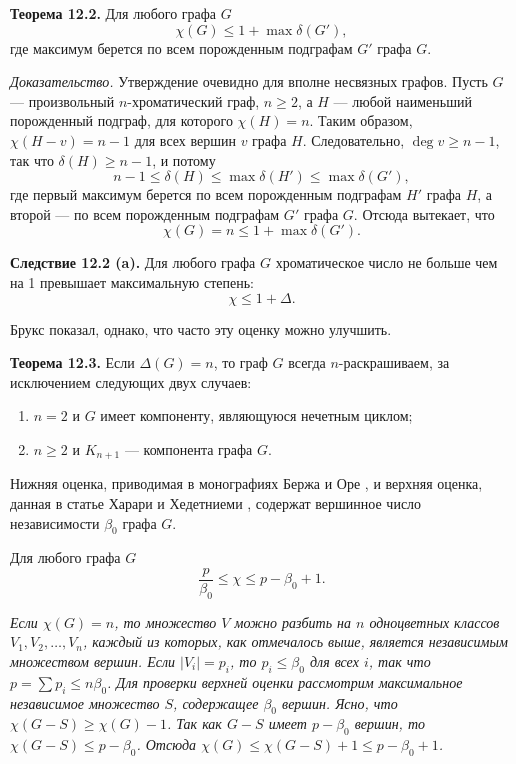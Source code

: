 \textbf{Теорема 12.2.} Для любого графа $G$
\[
\chi(G) \leq 1 + \max \delta(G'),
\]
где максимум берется по всем порожденным подграфам $G'$ графа $G$.

\textit{Доказательство.} Утверждение очевидно для вполне несвязных графов. Пусть $G$ — произвольный $n$-хроматический граф, $n \geq 2$, а $H$ — любой наименьший порожденный подграф, для которого $\chi(H) = n$. Таким образом, $\chi(H - v) = n - 1$ для всех вершин $v$ графа $H$. Следовательно, $\deg v \geq n - 1$, так что $\delta(H) \geq n - 1$, и потому
\[
n - 1 \leq \delta(H) \leq \max \delta(H') \leq \max \delta(G'),
\]
где первый максимум берется по всем порожденным подграфам $H'$ графа $H$, а второй — по всем порожденным подграфам $G'$ графа $G$. Отсюда вытекает, что
\[
\chi(G) = n \leq 1 + \max \delta(G').
\]

\textbf{Следствие 12.2 (a).} Для любого графа $G$ хроматическое число не больше чем на 1 превышает максимальную степень:
\[
\chi \leq 1 + \Delta.
\]

Брукс \cite{Brooks} показал, однако, что часто эту оценку можно улучшить.

\textbf{Теорема 12.3.} Если $\Delta(G) = n$, то граф $G$ всегда $n$-раскрашиваем, за исключением следующих двух случаев:
\begin{enumerate}
    \item $n = 2$ и $G$ имеет компоненту, являющуюся нечетным циклом;
    \item $n \geq 2$ и $K_{n+1}$ — компонента графа $G$.
\end{enumerate}

Нижняя оценка, приводимая в монографиях Бержа \cite{Berge} и Оре \cite{Ore}, и верхняя оценка, данная в статье Харари и Хедетниеми \cite{HararyHedetniemi}, содержат вершинное число независимости $\beta_0$ графа $G$.

\begin{theorem}
Для любого графа $G$
\[
\frac{p}{\beta_0} \leq \chi \leq p - \beta_0 + 1.
\]
\end{theorem}

\textit{
Если $\chi(G) = n$, то множество $V$ можно разбить на $n$ одноцветных классов $V_1, V_2, \ldots, V_n$, каждый из которых, как отмечалось выше, является независимым множеством вершин. Если $|V_i| = p_i$, то $p_i \leq \beta_0$ для всех $i$, так что $p = \sum p_i \leq n \beta_0$.
Для проверки верхней оценки рассмотрим максимальное независимое множество $S$, содержащее $\beta_0$ вершин. Ясно, что $\chi(G - S) \geq \chi(G) - 1$. Так как $G - S$ имеет $p - \beta_0$ вершин, то $\chi(G - S) \leq p - \beta_0$. Отсюда $\chi(G) \leq \chi(G - S) + 1 \leq p - \beta_0 + 1$.
}

